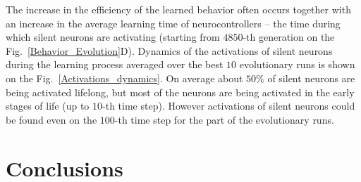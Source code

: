 \documentclass[letterpaper]{article}
\begin{document}
The increase in the efficiency of the learned behavior often occurs together with an increase in the average learning time of neurocontrollers -- the time during which silent neurons are activating (starting from $4850$-th generation on the Fig.~\ref{Behavior_Evolution}D). Dynamics of the activations of silent neurons during the learning process averaged over the best $10$ evolutionary runs is shown on the Fig.~\ref{Activations_dynamics}. On average about $50\%$ of silent neurons are being activated lifelong, but most of the neurons are being activated in the early stages of life (up to $10$-th time step). However activations of silent neurons could be found even on the $100$-th time step for the part of the evolutionary runs.       

\section{Conclusions}

\footnotesize


\end{document}
